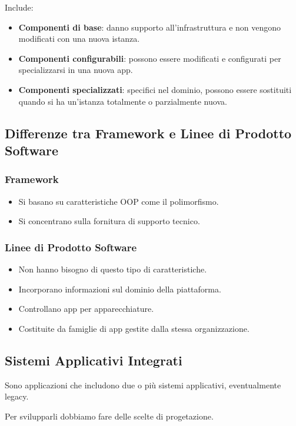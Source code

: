 \documentclass{report}
\begin{document}
\noindent
Include:
\begin{itemize}
    \item \textbf{Componenti di base}: danno supporto all'infrastruttura e non vengono modificati con una nuova istanza.
    \item \textbf{Componenti configurabili}: possono essere modificati e configurati per specializzarsi in una nuova app.
    \item \textbf{Componenti specializzati}: specifici nel dominio, possono essere sostituiti quando si ha un'istanza totalmente o parzialmente nuova.
\end{itemize}

\subsection*{Differenze tra Framework e Linee di Prodotto Software}
\subsubsection*{Framework}
\begin{itemize}
    \item Si basano su caratteristiche OOP come il polimorfismo.
    \item Si concentrano sulla fornitura di supporto tecnico.
\end{itemize}

\subsubsection*{Linee di Prodotto Software}
\begin{itemize}
    \item Non hanno bisogno di questo tipo di caratteristiche.
    \item Incorporano informazioni sul dominio della piattaforma.
    \item Controllano app per apparecchiature.
    \item Costituite da famiglie di app gestite dalla stessa organizzazione.
\end{itemize}

\newpage
\subsection*{Sistemi Applicativi Integrati}
Sono applicazioni che includono due o più sistemi applicativi, eventualmente legacy.

\noindent
Per svilupparli dobbiamo fare delle scelte di progetazione.
\end{document}
